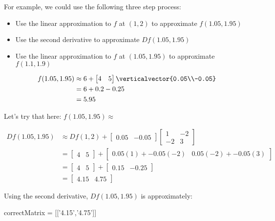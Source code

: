 \documentclass{ximera}
\begin{document}
\begin{question}
  For example, we could use the following three step process:
  
  \begin{itemize}
  \item Use the linear approximation to $f$ at $(1,2)$ to approximate $f(1.05,1.95)$
  \item Use the second derivative to approximate $Df(1.05,1.95)$
  \item Use the linear approximation to $f$ at $(1.05,1.95)$ to approximate $f(1.1,1.9)$
  \end{itemize}
  
  \begin{solution}
    \begin{hint}
      \begin{align*}
        f(1.05,1.95) &\approx 6+\begin{bmatrix} 4 & 5 \end{bmatrix} \verticalvector{0.05\\-0.05}\\
        &=6+0.2-0.25\\
        &=5.95
      \end{align*}
    \end{hint}
    Let's try that here:  $f(1.05,1.95) \approx$ 
  \end{solution}

  \begin{solution}
    \begin{hint}
      \begin{align*}
        Df(1.05,1.95) &\approx Df(1,2)+\begin{bmatrix} 0.05 & -0.05\end{bmatrix}\begin{bmatrix} 1 & -2 \\ -2 & 3\end{bmatrix}\\
        &= \begin{bmatrix} 4 & 5 \end{bmatrix} + \begin{bmatrix} 0.05(1)+-0.05(-2) & 0.05(-2)+-0.05(3)\end{bmatrix}\\
        &=\begin{bmatrix} 4 & 5 \end{bmatrix} + \begin{bmatrix} 0.15 & -0.25\end{bmatrix}\\
        &=\begin{bmatrix} 4.15 & 4.75\end{bmatrix}
      \end{align*}
    \end{hint}
    Using the second derivative, $Df(1.05,1.95) $ is approximately:
    \begin{matrix-answer}
      correctMatrix = [['4.15','4.75']]
    \end{matrix-answer}
  \end{solution}


\end{question}
\end{document}

